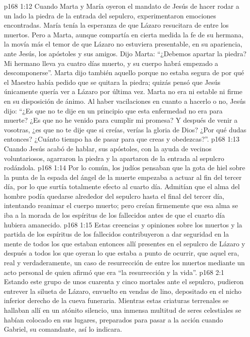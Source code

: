 \vs p168 1:12 Cuando Marta y María oyeron el mandato de Jesús de hacer rodar a un lado la piedra de la entrada del sepulcro, experimentaron emociones encontradas. María tenía la esperanza de que Lázaro resucitara de entre los muertos. Pero a Marta, aunque compartía en cierta medida la fe de su hermana, la movía más el temor de que Lázaro no estuviera presentable, en su apariencia, ante Jesús, los apóstoles y sus amigos. Dijo Marta: “¿Debemos apartar la piedra? Mi hermano lleva ya cuatro días muerto, y su cuerpo habrá empezado a descomponerse”. Marta dijo también aquello porque no estaba segura de por qué el Maestro había pedido que se quitara la piedra; quizás pensó que Jesús únicamente quería ver a Lázaro por última vez. Marta no era ni estable ni firme en su disposición de ánimo. Al haber vacilaciones en cuanto a hacerlo o no, Jesús dijo: “¿Es que no te dije en un principio que esta enfermedad no era para muerte? ¿Es que no he venido para cumplir mi promesa? Y después de venir a vosotras, ¿es que no te dije que si creías, verías la gloria de Dios? ¿Por qué dudas entonces? ¿Cuánto tiempo ha de pasar para que creas y obedezcas?”.
\vs p168 1:13 Cuando Jesús acabó de hablar, sus apóstoles, con la ayuda de vecinos voluntariosos, agarraron la piedra y la apartaron de la entrada al sepulcro rodándola.
\vs p168 1:14 \pc Por lo común, los judíos pensaban que la gota de hiel sobre la punta de la espada del ángel de la muerte empezaba a actuar al fin del tercer día, por lo que surtía totalmente efecto al cuarto día. Admitían que el alma del hombre podía quedarse alrededor del sepulcro hasta el final del tercer día, intentando reanimar el cuerpo muerto; pero creían firmemente que esa alma se iba a la morada de los espíritus de los fallecidos antes de que el cuarto día hubiera amanecido.
\vs p168 1:15 Estas creencias y opiniones sobre los muertos y la partida de los espíritus de los fallecidos contribuyeron a dar seguridad en la mente de todos los que estaban entonces allí presentes en el sepulcro de Lázaro y después a todos los que oyeran lo que estaba a punto de ocurrir, que aquel era, real y verdaderamente, un caso de resurrección de entre los muertos mediante un acto personal de quien afirmó que era “la resurrección y la vida”.
\vs p168 2:1 Estando este grupo de unos cuarenta y cinco mortales ante el sepulcro, pudieron entrever la silueta de Lázaro, envuelto en vendas de lino, depositado en el nicho inferior derecho de la cueva funeraria. Mientras estas criaturas terrenales se hallaban allí en un atónito silencio, una inmensa multitud de seres celestiales se habían colocado en sus lugares, preparados para pasar a la acción cuando Gabriel, su comandante, así lo indicara.
